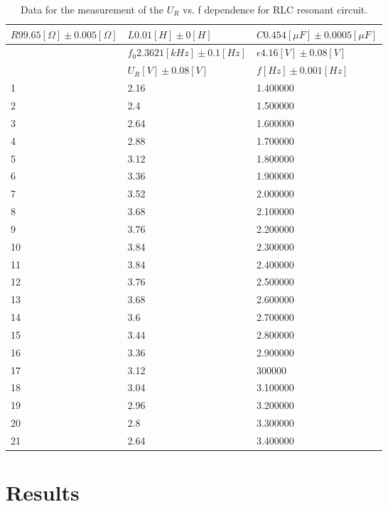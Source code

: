 \documentclass[12pt, a4paper, oneside]{article}
\begin{document}
\begin{table*}[!ht]
    \centering
    \begin{tabular}{|l|l|l|}
    \hline
        $R 99.65 [\Omega]\pm 0.005[\Omega]$ & $L 0.01 [H]\pm 0[H]$ & $C 0.454 [\mu F]\pm 0.0005[\mu F]$  \\ \hline
        ~ &$f_0 2.3621 [kHz]\pm 0.1[Hz]$ & $\epsilon 4.16 [V]\pm 0.08[V]$ \\ \hline
        ~ & $U_R [V]\pm 0.08[V]$ & $f [Hz]\pm 0.001[Hz]$ \\ \hline
        1 & 2.16 & 1.400000 \\ \hline
        2 & 2.4 & 1.500000 \\ \hline
        3 & 2.64 & 1.600000 \\ \hline
        4 & 2.88 & 1.700000 \\ \hline
        5 & 3.12 & 1.800000 \\ \hline
        6 & 3.36 & 1.900000 \\ \hline
        7 & 3.52 & 2.000000 \\ \hline
        8 & 3.68 & 2.100000 \\ \hline
        9 & 3.76 & 2.200000 \\ \hline
        10 & 3.84 & 2.300000 \\ \hline
        11 & 3.84 & 2.400000 \\ \hline
        12 & 3.76 & 2.500000 \\ \hline
        13 & 3.68 & 2.600000 \\ \hline
        14 & 3.6 & 2.700000 \\ \hline
        15 & 3.44 & 2.800000 \\ \hline
        16 & 3.36 & 2.900000 \\ \hline
        17 & 3.12 & 300000 \\ \hline
        18 & 3.04 & 3.100000 \\ \hline
        19 & 2.96 & 3.200000 \\ \hline
        20 & 2.8 & 3.300000 \\ \hline
        21 & 2.64 & 3.400000 \\ \hline
  \end{tabular}
  \caption{Data for the measurement of the $U_R$ vs. f dependence for RLC resonant circuit.}
  \label{tb_measurement4}
\end{table*}


\section{Results}
\end{document}
